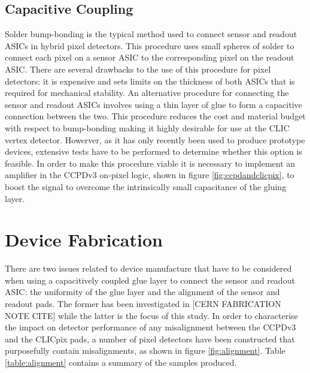 
\subsection{Capacitive Coupling}

Solder bump-bonding is the typical method used to connect sensor and readout ASICs in hybrid pixel detectors.  This procedure uses small spheres of solder to connect each pixel on a sensor ASIC to the corresponding pixel on the readout ASIC.  There are several drawbacks to the use of this procedure for pixel detectors: it is expensive and sets limits on the thickness of both ASICs that is required for mechanical stability.  An alternative procedure for connecting the sensor and readout ASICs involves using a thin layer of glue to form a capacitive connection between the two.  This procedure reduces the cost and material budget with respect to bump-bonding making it highly desirable for use at the CLIC vertex detector.  Howerver, as it has only recently been used to produce prototype devices, extensive tests have to be performed to determine whether this option is feasible.  In order to make this procedure viable it is necessary to implement an amplifier in the CCPDv3 on-pixel logic, shown in figure \ref{fig:ccpdandclicpix}, to boost the signal to overcome the intrinsically small capacitance of the gluing layer.


\section{Device Fabrication}

There are two issues related to device manufacture that have to be considered when using a capacitively coupled glue layer to connect the sensor and readout ASIC: the uniformity of the glue layer and the alignment of the sensor and readout pads.  The former has been investigated in [CERN FABRICATION NOTE CITE] while the latter is the focus of this study.  In order to characterise the impact on detector performance of any misalignment between the CCPDv3 and the CLICpix pads, a number of pixel detectors have been constructed that purposefully contain misalignments, as shown in figure \ref{fig:alignment}.  Table \ref{table:alignment} contains a summary of the samples produced.


